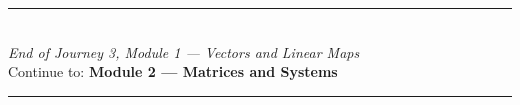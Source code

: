 \documentclass[12pt, a4paper]{article}
\begin{document}
\vspace{1.4cm}
\begin{center}
{\color{MidBlue}\rule{0.5\linewidth}{0.8pt}}\\[6pt]
{\small\color{DarkGrey}\textit{End of Journey 3, Module 1 --- Vectors and Linear Maps}}\\[4pt]
{\small\color{DarkGrey}Continue to: \textbf{Module 2 --- Matrices and Systems}}\\[6pt]
{\color{MidBlue}\rule{0.5\linewidth}{0.8pt}}
\end{center}
\end{document}
